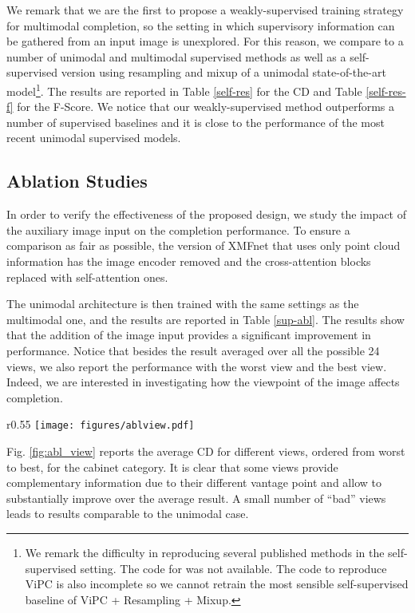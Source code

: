 \documentclass{article}
\begin{document}
We remark that we are the first to propose a weakly-supervised training strategy for multimodal completion, so the setting in which supervisory information can be gathered from an input image is unexplored. For this reason, we compare to a number of unimodal and multimodal supervised methods as well as a self-supervised version using resampling and mixup of a unimodal state-of-the-art model\footnote{We remark the difficulty in reproducing several published methods in the self-supervised setting. The code for \cite{selfsup,crn} was not available. The code to reproduce ViPC \cite{vipc} is also incomplete so we cannot retrain the most sensible self-supervised baseline of ViPC + Resampling + Mixup.}. The results are reported in Table \ref{self-res} for the CD and Table \ref{self-res-f} for the F-Score. We notice that our weakly-supervised method outperforms a number of supervised baselines and it is close to the performance of the most recent unimodal supervised models.



\subsection{Ablation Studies}

In order to verify the effectiveness of the proposed design, we study the impact of the auxiliary image input on the completion performance. To ensure a comparison as fair as possible, the version of XMFnet that uses only point cloud information has the image encoder removed and the cross-attention blocks replaced with self-attention ones.  

The unimodal architecture is then trained with the same settings as the multimodal one, and the results are reported in Table \ref{sup-abl}. The results show that the addition of the image input provides a significant improvement in performance. Notice that besides the result averaged over all the possible 24 views, we also report the performance with the worst view and the best view. Indeed, we are interested in investigating how the viewpoint of the image affects completion. \begin{wrapfigure}[20]{r}{0.55\textwidth}
\centering
\vspace{-10pt}
\texttt{[image: figures/ablview.pdf]}
\vspace{-10pt}
\caption{Impact of image contribution as function of point of view, sorted by reconstruction CD (from worst to best) averaged over cabinet category, supervised setting.}
\label{fig:abl_view}
\end{wrapfigure}
Fig. \ref{fig:abl_view} reports the average CD for different views, ordered from worst to best, for the cabinet category. It is clear that some views provide complementary information due to their different vantage point and allow to substantially improve over the average result. A small number of ``bad'' views leads to results comparable to the unimodal case.
\end{document}
